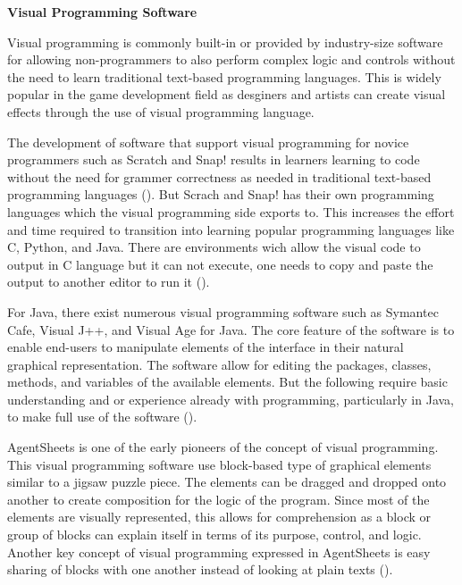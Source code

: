 \flushleft
\textbf{Visual Programming Software}\\
\justifying

\parx
Visual programming is commonly built-in or provided by industry-size software for
allowing non-programmers to also perform complex logic and controls without the need to
learn traditional text-based programming languages. This is widely popular in the game
development field as desginers and artists can create visual effects through the use of
visual programming language.

The development of software that support visual programming for novice programmers such
as Scratch and Snap! results in learners learning to code without the need for grammer
correctness as needed in traditional text-based programming languages
(\cite{bau_gray_kelleher_sheldon_turbak_2017}). But Scrach and Snap! has their own
programming languages which the visual programming side exports to.  This increases the
effort and time required to transition into learning popular programming languages like
C, Python, and Java. There are environments wich allow the visual code to output in
C language but it can not execute, one needs to copy and paste the output to another
editor to run it (\cite{abe_fukawa_tanaka_2019}).

For Java, there exist numerous visual programming software such as Symantec Cafe,
Visual J++, and Visual Age for Java. The core feature of the software is to enable
end-users to manipulate elements of the interface in their natural graphical
representation. The software allow for editing the packages, classes, methods, and
variables of the available elements. But the following require basic understanding and
or experience already with programming, particularly in Java, to make full use of the
software (\cite{prokhorov_kosarev}).

AgentSheets is one of the early pioneers of the concept of visual programming. This
visual programming software use block-based type of graphical elements similar to
a jigsaw puzzle piece. The elements can be dragged and dropped onto another to create
composition for the logic of the program. Since most of the elements are visually
represented, this allows for comprehension as a block or group of blocks can explain
itself in terms of its purpose, control, and logic. Another key concept of visual
programming expressed in AgentSheets is easy sharing of blocks with one another
instead of looking at plain texts (\cite{repenning_2017}).
